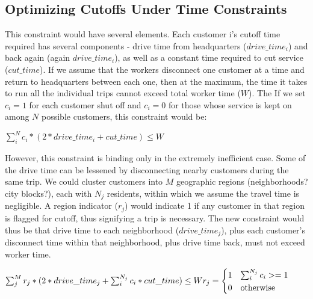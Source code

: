 \documentclass[]{article}
\begin{document}
\begin{large}
\section{Optimizing Cutoffs Under Time Constraints}

This constraint would have several elements. Each customer i's cutoff time required has several components - drive time from headquarters ($drive\_time_i$) and back again (again $drive\_time_i$), as well as a constant time required to cut service ($cut\_time$). If we assume that the workers disconnect one customer at a time and return to headquarters between each one, then at the maximum, the time it takes to run all the individual trips cannot exceed total worker time ($W$). The If we set $c_i = 1$ for each customer shut off and $c_i = 0$ for those whose service is kept on among $N$ possible customers, this constraint would be:


\begin{math}
\sum_{i}^{N}c_i*(2*drive\_time_i + cut\_time) \leq W
\end{math}

However, this constraint is binding only in the extremely inefficient case. Some of the drive time can be lessened by disconnecting nearby customers during the same trip. We could cluster customers into $M$ geographic regions (neighborhoods? city blocks?), each with $N_j$ residents, within which we assume the travel time is negligible. A region indicator ($r_j$) would indicate 1 if any customer in that region is flagged for cutoff, thus signifying a trip is necessary. The new constraint would thus be that drive time to each neighborhood ($drive\_time_j$), plus each customer's disconnect time within that neighborhood, plus drive time back, must not exceed worker time.

\begin{math}
\sum_{j}^{M} r_j * (2 * drive\_time_j + \sum_{i}^{N_j} c_i * cut\_time) \leq W \\
r_j = \begin{dcases*}
1 & $\sum_{i}^{N_j}c_i >= 1$ \\
0 & otherwise
\end{dcases*}
\end{math} 

\end{large}
\end{document}
